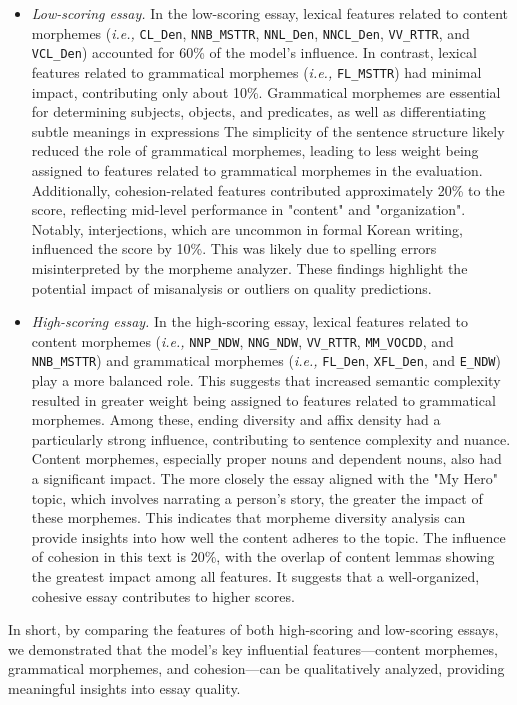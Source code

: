 \begin{itemize}[leftmargin=1.1em, ]
    \item \textsf{\textit{Low-scoring essay.}} In the low-scoring essay, lexical features related to content morphemes (\textit{i.e.,} \texttt{CL\_Den}, \texttt{NNB\_MSTTR}, \texttt{NNL\_Den}, \texttt{NNCL\_Den}, \texttt{VV\_RTTR}, and \texttt{VCL\_Den}) accounted for 60\% of the model's influence. In contrast, lexical features related to grammatical morphemes (\textit{i.e.,} \texttt{FL\_MSTTR}) had minimal impact, contributing only about 10\%. 
    Grammatical morphemes are essential for determining subjects, objects, and predicates, as well as differentiating subtle meanings in expressions
    The simplicity of the sentence structure likely reduced the role of grammatical morphemes, leading to less weight being assigned to features related to grammatical morphemes in the evaluation. 
    Additionally, cohesion-related features contributed approximately 20\% to the score, reflecting mid-level performance in "content" and "organization".
    Notably, interjections, which are uncommon in formal Korean writing, influenced the score by 10\%. 
    This was likely due to spelling errors misinterpreted by the morpheme analyzer. These findings highlight the potential impact of misanalysis or outliers on quality predictions.

    \item \textsf{\textit{High-scoring essay.}} In the high-scoring essay, lexical features related to content morphemes (\textit{i.e.,} \texttt{NNP\_NDW}, \texttt{NNG\_NDW}, \texttt{VV\_RTTR}, \texttt{MM\_VOCDD}, and \texttt{NNB\_MSTTR}) and grammatical morphemes (\textit{i.e.,} \texttt{FL\_Den}, \texttt{XFL\_Den}, and \texttt{E\_NDW}) play a more balanced role. 
    This suggests that increased semantic complexity resulted in greater weight being assigned to features related to grammatical morphemes. 
    Among these, ending diversity and affix density had a particularly strong influence, contributing to sentence complexity and nuance.
    Content morphemes, especially proper nouns and dependent nouns, also had a significant impact.
    The more closely the essay aligned with the "My Hero" topic, which involves narrating a person's story, the greater the impact of these morphemes. This indicates that morpheme diversity analysis can provide insights into how well the content adheres to the topic. The influence of cohesion in this text is 20\%, with the overlap of content lemmas showing the greatest impact among all features. It suggests that a well-organized, cohesive essay contributes to higher scores.
\end{itemize}
In short, by comparing the features of both high-scoring and low-scoring essays, we demonstrated that the model's key influential features—content morphemes, grammatical morphemes, and cohesion—can be qualitatively analyzed, 
providing meaningful insights into essay quality.
